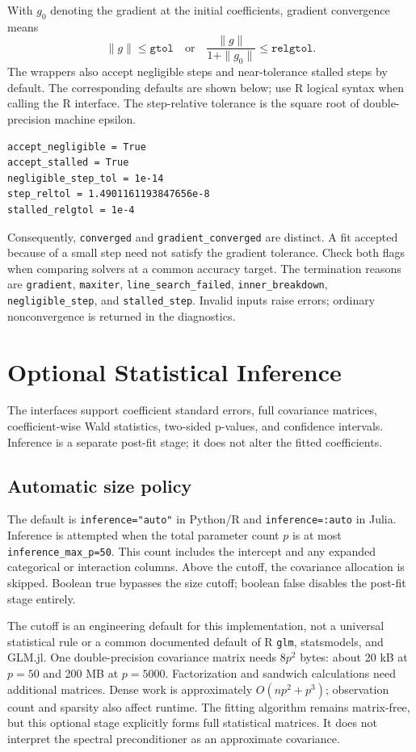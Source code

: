 \documentclass[11pt,a4paper]{article}
\newcommand{\code}[1]{\texttt{#1}}
\begin{document}
With $g_0$ denoting the gradient at the initial coefficients, gradient convergence
means
\[
 \|g\|\leq\code{gtol}
 \quad\text{or}\quad
 \frac{\|g\|}{1+\|g_0\|}\leq\code{relgtol}.
\]
The wrappers also accept negligible steps and near-tolerance stalled steps by
default. The corresponding defaults are shown below; use R logical syntax
when calling the R interface. The step-relative tolerance is the square root
of double-precision machine epsilon.
\begin{lstlisting}
accept_negligible = True
accept_stalled = True
negligible_step_tol = 1e-14
step_reltol = 1.4901161193847656e-8
stalled_relgtol = 1e-4
\end{lstlisting}

Consequently, \code{converged} and \code{gradient\_converged} are distinct.
A fit accepted because of a small step need not satisfy the gradient tolerance.
Check both flags when comparing solvers at a common accuracy target.
The termination reasons are \code{gradient}, \code{maxiter},
\code{line\_search\_failed}, \code{inner\_breakdown},
\code{negligible\_step}, and \code{stalled\_step}.
Invalid inputs raise errors; ordinary nonconvergence is returned in the diagnostics.

\section{Optional Statistical Inference}
The interfaces support coefficient standard errors, full covariance matrices,
coefficient-wise Wald statistics, two-sided p-values, and confidence intervals.
Inference is a separate post-fit stage; it does not alter the fitted coefficients.

\subsection{Automatic size policy}
The default is \code{inference="auto"} in Python/R and
\code{inference=:auto} in Julia. Inference is attempted when the total parameter
count $p$ is at most \code{inference\_max\_p=50}. This count includes the
intercept and any expanded categorical or interaction columns. Above the cutoff,
the covariance allocation is skipped. Boolean true bypasses the size cutoff;
boolean false disables the post-fit stage entirely.

The cutoff is an engineering default for this implementation, not a universal
statistical rule or a common documented default of R \code{glm}, statsmodels,
and GLM.jl. One double-precision covariance matrix needs $8p^2$ bytes: about
20 kB at $p=50$ and 200 MB at $p=5000$. Factorization and sandwich calculations
need additional matrices. Dense work is approximately $O(np^2+p^3)$;
observation count and sparsity also affect runtime. The fitting algorithm remains
matrix-free, but this optional stage explicitly forms full statistical matrices.
It does not interpret the spectral preconditioner as an approximate covariance.
\end{document}
